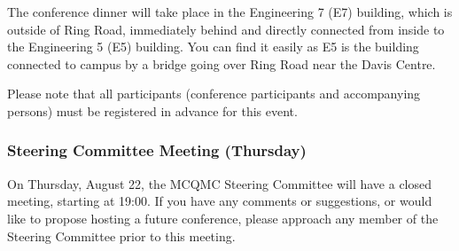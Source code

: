 The conference dinner will take place in the Engineering 7 (E7) building, which is outside of Ring Road, immediately behind and directly connected from inside to the Engineering 5 (E5) building. You can find it easily as E5 is the building connected to campus by a bridge going over Ring Road near the Davis Centre. 

Please note that all participants (conference participants and accompanying persons) must be registered in advance for this event.


\subsubsection{Steering Committee Meeting (Thursday)}

On Thursday, August 22, the MCQMC Steering Committee will have a closed meeting, starting at 19:00. If
you have any comments or suggestions, or would like to propose hosting a
future conference, please approach any member of the Steering Committee
prior to this meeting. 

